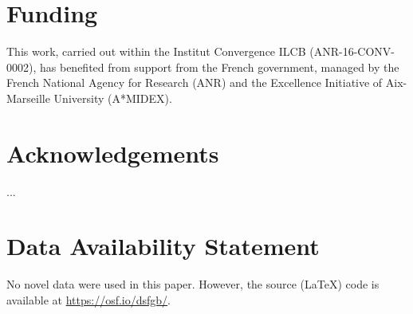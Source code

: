 \documentclass[utf8]{template/frontiersSCNS} %
\begin{document}
\section*{Funding}


This work, carried out within the Institut Convergence ILCB (ANR-16-CONV-0002), has benefited from support from the French government, managed by the French National Agency for Research (ANR) and the Excellence Initiative of Aix-Marseille University (A*MIDEX).

\section*{Acknowledgements}

...



\section*{Data Availability Statement}

No novel data were used in this paper. However, the source (\LaTeX) code is available at \url{https://osf.io/dsfgb/}.


% 

\end{document}
